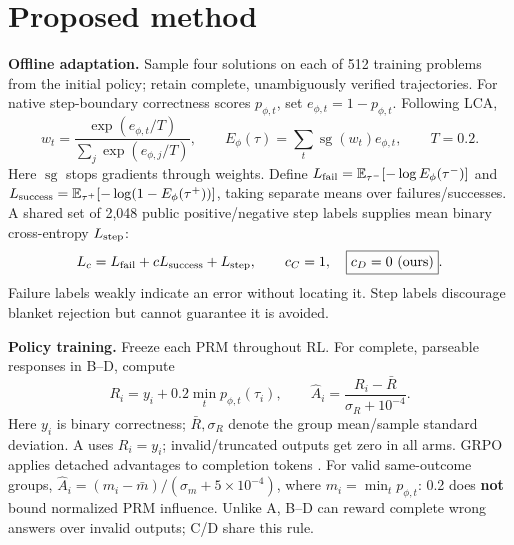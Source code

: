 \documentclass{article}
\newcommand{\E}{\mathbb{E}}
\newcommand{\sg}{\operatorname{sg}}
\begin{document}
\section{Proposed method}
\textbf{Offline adaptation.} Sample four solutions on each of 512 training problems from the initial policy; retain complete, unambiguously verified trajectories. For native step-boundary correctness scores $p_{\phi,t}$, set $e_{\phi,t}=1-p_{\phi,t}$. Following LCA,
\begin{equation}
 w_t=\frac{\exp(e_{\phi,t}/T)}{\sum_j\exp(e_{\phi,j}/T)},\qquad
 E_\phi(\tau)=\sum_t\sg(w_t)e_{\phi,t},\qquad T=0.2 .
\end{equation}
Here $\sg$ stops gradients through weights. Define $L_{\rm fail}=\E_{\tau^-}[-\log E_\phi(\tau^-)]$ and $L_{\rm success}=\E_{\tau^+}[-\log(1-E_\phi(\tau^+))]$, taking separate means over failures/successes. A shared set of 2,048 public positive/negative step labels supplies mean binary cross-entropy $L_{\rm step}$:
\begin{equation}
 L_c=L_{\rm fail}+cL_{\rm success}+L_{\rm step},\qquad
 c_C=1,\quad \boxed{c_D=0\ \text{(ours)}} .
\end{equation}
Failure labels weakly indicate an error without locating it. Step labels discourage blanket rejection but cannot guarantee it is avoided.

\newpage
\noindent\textbf{Policy training.} Freeze each PRM throughout RL. For complete, parseable responses in B--D, compute
\begin{equation}
 R_i=y_i+0.2\min_t p_{\phi,t}(\tau_i),\qquad
 \hat A_i=\frac{R_i-\bar R}{\sigma_R+10^{-4}} .
\end{equation}
Here $y_i$ is binary correctness; $\bar R,\sigma_R$ denote the group mean/sample standard deviation. A uses $R_i=y_i$; invalid/truncated outputs get zero in all arms. GRPO applies detached advantages to completion tokens \citep{shao2024}. For valid same-outcome groups, \mbox{$\hat A_i=(m_i-\bar m)/(\sigma_m+5\!\times\!10^{-4})$}, where $m_i=\min_t p_{\phi,t}$: 0.2 does \textbf{not} bound normalized PRM influence. Unlike A, B--D can reward complete wrong answers over invalid outputs; C/D share this rule.
\end{document}
